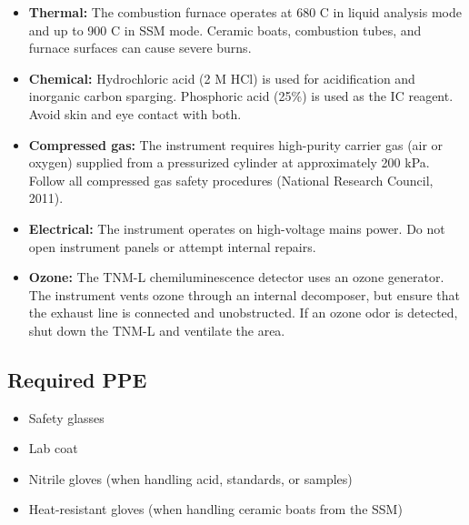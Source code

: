 \documentclass[
  11pt,
  letterpaper,
]{article}
\providecommand{\tightlist}{%
  \setlength{\itemsep}{0pt}\setlength{\parskip}{0pt}}
\begin{document}
\begin{tcolorbox}[enhanced jigsaw, arc=.35mm, bottomrule=.15mm, bottomtitle=1mm, breakable, colback=white, colbacktitle=quarto-callout-warning-color!10!white, colframe=quarto-callout-warning-color-frame, coltitle=black, left=2mm, leftrule=.75mm, opacityback=0, opacitybacktitle=0.6, rightrule=.15mm, title=\textcolor{quarto-callout-warning-color}{\faExclamationTriangle}\hspace{0.5em}{Hazards}, titlerule=0mm, toprule=.15mm, toptitle=1mm]

\begin{itemize}
\tightlist
\item
  \textbf{Thermal:} The combustion furnace operates at 680 C in liquid
  analysis mode and up to 900 C in SSM mode. Ceramic boats, combustion
  tubes, and furnace surfaces can cause severe burns.
\item
  \textbf{Chemical:} Hydrochloric acid (2 M HCl) is used for
  acidification and inorganic carbon sparging. Phosphoric acid (25\%) is
  used as the IC reagent. Avoid skin and eye contact with both.
\item
  \textbf{Compressed gas:} The instrument requires high-purity carrier
  gas (air or oxygen) supplied from a pressurized cylinder at
  approximately 200 kPa. Follow all compressed gas safety procedures
  (National Research Council, 2011).
\item
  \textbf{Electrical:} The instrument operates on high-voltage mains
  power. Do not open instrument panels or attempt internal repairs.
\item
  \textbf{Ozone:} The TNM-L chemiluminescence detector uses an ozone
  generator. The instrument vents ozone through an internal decomposer,
  but ensure that the exhaust line is connected and unobstructed. If an
  ozone odor is detected, shut down the TNM-L and ventilate the area.
\end{itemize}

\end{tcolorbox}

\subsection{Required PPE}\label{required-ppe}

\begin{itemize}
\tightlist
\item[$\square$]
  Safety glasses
\item[$\square$]
  Lab coat
\item[$\square$]
  Nitrile gloves (when handling acid, standards, or samples)
\item[$\square$]
  Heat-resistant gloves (when handling ceramic boats from the SSM)
\end{itemize}
\end{document}
